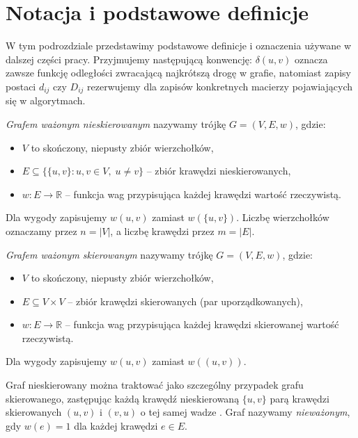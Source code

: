 \section{Notacja i podstawowe definicje}
\label{sec:notacja}
W tym podrozdziale przedstawimy podstawowe definicje i oznaczenia używane w dalszej części pracy. Przyjmujemy następującą konwencję: $\delta(u,v)$ oznacza zawsze funkcję odległości zwracającą najkrótszą drogę w grafie, natomiast zapisy postaci $d_{ij}$ czy $D_{ij}$ rezerwujemy dla zapisów konkretnych macierzy pojawiających się w algorytmach.

\begin{definicja}
\emph{Grafem ważonym nieskierowanym} nazywamy trójkę $G = (V, E, w)$, gdzie:
\begin{itemize}
  \item $V$ to skończony, niepusty zbiór wierzchołków,
  \item $E \subseteq \bigl\{\{u,v\} : u, v \in V,\; u \neq v\bigr\}$
        -- zbiór krawędzi nieskierowanych,
  \item $w \colon E \to \mathbb{R}$ -- funkcja wag przypisująca
        każdej krawędzi wartość rzeczywistą.
\end{itemize}
Dla wygody zapisujemy $w(u,v)$ zamiast $w(\{u,v\})$.
Liczbę wierzchołków oznaczamy przez $n = |V|$, a liczbę krawędzi
przez $m = |E|$.
\end{definicja}

\begin{definicja}
\emph{Grafem ważonym skierowanym} nazywamy trójkę $G = (V, E, w)$, gdzie:
\begin{itemize}
  \item $V$ to skończony, niepusty zbiór wierzchołków,
  \item $E \subseteq V \times V$ -- zbiór krawędzi skierowanych
        (par uporządkowanych),
  \item $w \colon E \to \mathbb{R}$ -- funkcja wag przypisująca
        każdej krawędzi skierowanej wartość rzeczywistą.
\end{itemize}
Dla wygody zapisujemy $w(u,v)$ zamiast $w((u,v))$.
\end{definicja}

Graf nieskierowany można traktować jako szczególny przypadek
grafu skierowanego, zastępując każdą krawędź nieskierowaną
$\{u,v\}$ parą krawędzi skierowanych $(u,v)$ i $(v,u)$
o tej samej wadze \cite{Rosen2019}. Graf nazywamy
\emph{nieważonym}, gdy $w(e) = 1$ dla każdej krawędzi $e \in E$.

